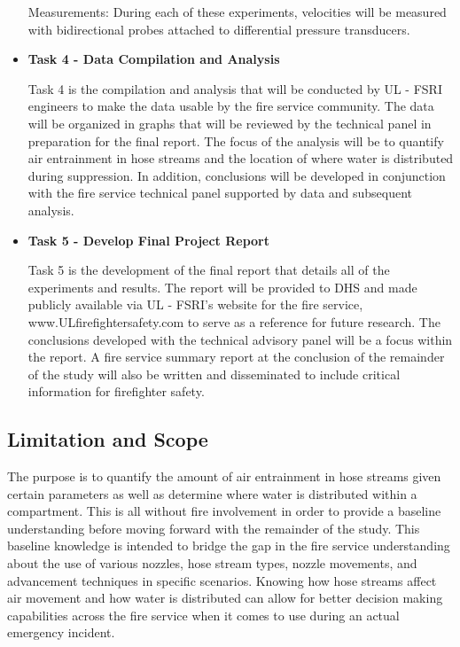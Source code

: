 \documentclass{article}
\begin{document}
\begin{itemize}
Measurements: During each of these experiments, velocities will be measured with bidirectional probes attached to differential pressure transducers. 
\vspace*{\baselineskip}

\item \bf{Task 4 - Data Compilation and Analysis}
\normalfont
\vspace*{\baselineskip}

Task 4 is the compilation and analysis that will be conducted by UL - FSRI engineers to make the data usable by the fire service community. The data will be organized in graphs that will be reviewed by the technical panel in preparation for the final report. The focus of the analysis will be to quantify air entrainment in hose streams and the location of where water is distributed during suppression. In addition, conclusions will be developed in conjunction with the fire service technical panel supported by data and subsequent analysis.
\vspace*{\baselineskip}

\item \bf{Task 5 - Develop Final Project Report}
\normalfont
\vspace*{\baselineskip}

Task 5 is the development of the final report that details all of the experiments and results. The report will be provided to DHS and made publicly available via UL - FSRI's website for the fire service, www.ULfirefightersafety.com to serve as a reference for future research. The conclusions developed with the technical advisory panel will be a focus within the report. A fire service summary report at the conclusion of the remainder of the study will also be written and disseminated to include critical information for firefighter safety.
\vspace*{\baselineskip}

\end{itemize}

\clearpage

\subsection{Limitation and Scope}

The purpose is to quantify the amount of air entrainment in hose streams given certain parameters as well as determine where water is distributed within a compartment. This is all without fire involvement in order to provide a baseline understanding before moving forward with the remainder of the study. This baseline knowledge is intended to bridge the gap in the fire service understanding about the use of various nozzles, hose stream types, nozzle movements, and advancement techniques in specific scenarios. Knowing how hose streams affect air movement and how water is distributed can allow for better decision making capabilities across the fire service when it comes to use during an actual emergency incident.
\end{document}

